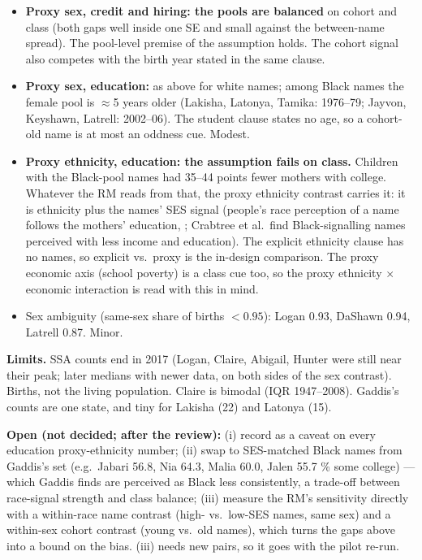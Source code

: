 \documentclass{article}
\begin{document}
\begin{itemize}
  \item \textbf{Proxy sex, credit and hiring: the pools are balanced} on cohort and class (both gaps well inside one
        SE and small against the between-name spread). The pool-level premise of the assumption holds. The
        cohort signal also competes with the birth year stated in the same clause.
  \item \textbf{Proxy sex, education:} as above for white names; among Black names the female pool is $\approx$5 years
        older (Lakisha, Latonya, Tamika: 1976--79; Jayvon, Keyshawn, Latrell: 2002--06). The student clause
        states no age, so a cohort-old name is at most an oddness cue. Modest.
  \item \textbf{Proxy ethnicity, education: the assumption fails on class.} Children with the Black-pool names had
        35--44 points fewer mothers with college. Whatever the RM reads from that, the proxy ethnicity contrast
        carries it: it is ethnicity plus the names' SES signal (people's race perception of a name follows the
        mothers' education, \citealp{gaddis2017lakisha}; Crabtree et al.\ find Black-signalling names perceived
        with less income and education). The explicit ethnicity clause has no names, so explicit vs.\ proxy is the
        in-design comparison. The proxy economic axis (school poverty) is a class cue too, so the proxy
        ethnicity $\times$ economic interaction is read with this in mind.
  \item Sex ambiguity (same-sex share of births $<0.95$): Logan 0.93, DaShawn 0.94, Latrell 0.87. Minor.
\end{itemize}

\textbf{Limits.} SSA counts end in 2017 (Logan, Claire, Abigail, Hunter were still near their peak; later
medians with newer data, on both sides of the sex contrast). Births, not the living population. Claire is bimodal
(IQR 1947--2008). Gaddis's counts are one state, and tiny for Lakisha (22) and Latonya (15).

\textbf{Open (not decided; after the review):} (i) record as a caveat on every education proxy-ethnicity number;
(ii) swap to SES-matched Black names from Gaddis's set (e.g.\ Jabari 56.8, Nia 64.3, Malia 60.0, Jalen 55.7 \% some
college) --- which Gaddis finds are perceived as Black less consistently, a trade-off between race-signal
strength and class balance; (iii) measure the RM's sensitivity directly with a within-race name contrast (high-
vs.\ low-SES names, same sex) and a within-sex cohort contrast (young vs.\ old names), which turns the gaps above
into a bound on the bias. (iii) needs new pairs, so it goes with the pilot re-run.
\end{document}
